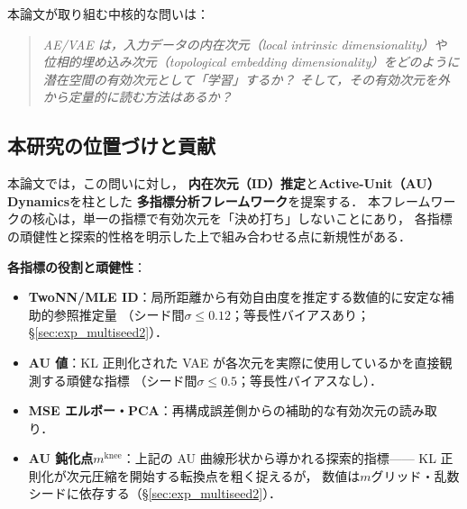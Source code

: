 \documentclass[11pt,a4paper]{jsarticle}
\newcommand{\mknee}{m^{\mathrm{knee}}}
\begin{document}
本論文が取り組む中核的な問いは：
\begin{quote}
\textit{AE/VAE は，入力データの内在次元（local intrinsic dimensionality）や
位相的埋め込み次元（topological embedding dimensionality）をどのように
潜在空間の有効次元として「学習」するか？
そして，その有効次元を外から定量的に読む方法はあるか？}
\end{quote}

\subsection{本研究の位置づけと貢献}\label{sec:intro_aim}

本論文では，この問いに対し，
\textbf{内在次元（ID）推定}と\textbf{Active-Unit（AU）Dynamics}を柱とした
\textbf{多指標分析フレームワーク}を提案する．
本フレームワークの核心は，単一の指標で有効次元を「決め打ち」しないことにあり，
各指標の頑健性と探索的性格を明示した上で組み合わせる点に新規性がある．

\textbf{各指標の役割と頑健性}：
\begin{itemize}
  \item \textbf{TwoNN/MLE ID}：局所距離から有効自由度を推定する数値的に安定な補助的参照推定量
        （シード間$\sigma \leq 0.12$；等長性バイアスあり；§\ref{sec:exp_multiseed2}）．
  \item \textbf{AU 値}：KL 正則化された VAE が各次元を実際に使用しているかを直接観測する頑健な指標
        （シード間$\sigma \leq 0.5$；等長性バイアスなし）．
  \item \textbf{MSE エルボー・PCA}：再構成誤差側からの補助的な有効次元の読み取り．
  \item \textbf{AU 鈍化点$\mknee$}：上記の AU 曲線形状から導かれる探索的指標——
        KL 正則化が次元圧縮を開始する転換点を粗く捉えるが，
        数値は$m$グリッド・乱数シードに依存する（§\ref{sec:exp_multiseed2}）．
\end{itemize}
\end{document}
